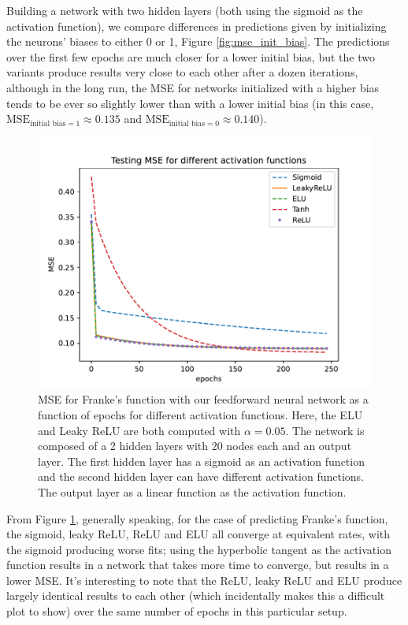 \documentclass[aps,reprint,superscriptaddress,nofootinbib]{revtex4-2}
\begin{document}
Building a network with two hidden layers (both using the sigmoid as the activation function), we compare differences in predictions given by initializing the neurons' biases to either 0 or 1, Figure \ref{fig:mse_init_bias}. The predictions over the first few epochs are much closer for a lower initial bias, but the two variants produce results very close to each other after a dozen iterations, although in the long run, the MSE for networks initialized with a higher bias tends to be ever so slightly lower than with a lower initial bias (in this case, \(\text{MSE}_{\text{initial bias} = 1} \approx 0.135\) and \(\text{MSE}_{\text{initial bias} = 0} \approx 0.140\)).

\begin{figure}[htp]
    \centering
    \includegraphics[width=\linewidth]{part_c/1_mse_epochs_activ_funcs.pdf}
    \caption{MSE for Franke's function with our feedforward neural network as a function of epochs for different activation functions. Here, the ELU and Leaky ReLU are both computed with \(\alpha=0.05\). The network is composed of a 2 hidden layers with 20 nodes each and an output layer.  The first hidden layer has a sigmoid as an activation function and the second hidden layer can have different activation functions. The output layer as a linear function as the activation function.}
    \label{fig:mse_activ_func}
\end{figure}

From Figure \ref{fig:mse_activ_func}, generally speaking, for the case of predicting Franke's function, the sigmoid, leaky ReLU, ReLU and ELU all converge at equivalent rates, with the sigmoid producing worse fits; using the hyperbolic tangent as the activation function results in a network that takes more time to converge, but results in a lower MSE. It's interesting to note that the ReLU, leaky ReLU and ELU produce largely identical results to each other (which incidentally makes this a difficult plot to show) over the same number of epochs in this particular setup.
\end{document}
